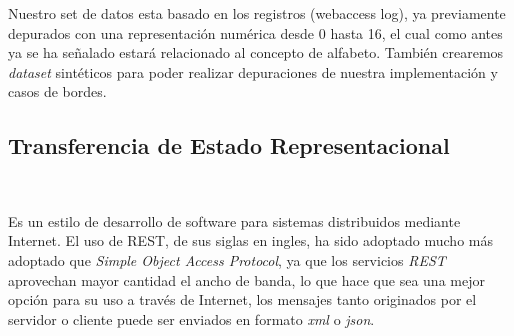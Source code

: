 	Nuestro set de  datos esta basado en los registros (webaccess log), ya previamente depurados con una representación numérica desde 0 hasta 16, el cual como antes ya se ha señalado estará relacionado al concepto de alfabeto. También crearemos \emph{dataset} sintéticos para poder realizar depuraciones de nuestra implementación y casos de bordes.
	
	 



 














\subsection{Transferencia de Estado Representacional}~\label{concept-rest}

Es un estilo de desarrollo de software para sistemas distribuidos mediante Internet. El uso de REST, de sus siglas en ingles, ha sido adoptado mucho más adoptado que  \emph{Simple Object Access Protocol}, ya que los servicios \emph{REST} aprovechan mayor cantidad el ancho de banda, lo que hace que sea una mejor opción para su uso a través de Internet, los mensajes tanto originados por el servidor o cliente puede ser enviados en formato \emph{xml} o \emph{json}. 



